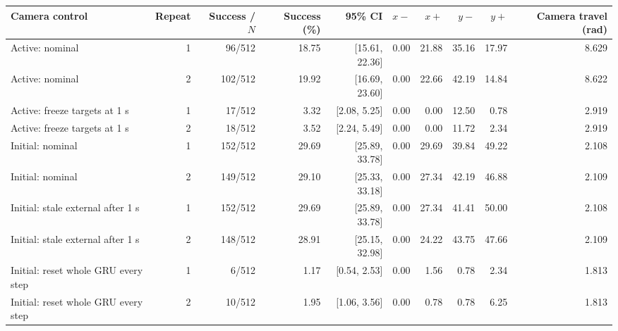 \begin{tabular}{lrrrrrrrrr}
\hline
Camera control & Repeat & Success / $N$ & Success (\%) & 95\% CI & $x-$ & $x+$ & $y-$ & $y+$ & Camera travel (rad) \\
\hline
Active: nominal & 1 & 96/512 & 18.75 & [15.61, 22.36] & 0.00 & 21.88 & 35.16 & 17.97 & 8.629 \\
Active: nominal & 2 & 102/512 & 19.92 & [16.69, 23.60] & 0.00 & 22.66 & 42.19 & 14.84 & 8.622 \\
Active: freeze targets at 1 s & 1 & 17/512 & 3.32 & [2.08, 5.25] & 0.00 & 0.00 & 12.50 & 0.78 & 2.919 \\
Active: freeze targets at 1 s & 2 & 18/512 & 3.52 & [2.24, 5.49] & 0.00 & 0.00 & 11.72 & 2.34 & 2.919 \\
Initial: nominal & 1 & 152/512 & 29.69 & [25.89, 33.78] & 0.00 & 29.69 & 39.84 & 49.22 & 2.108 \\
Initial: nominal & 2 & 149/512 & 29.10 & [25.33, 33.18] & 0.00 & 27.34 & 42.19 & 46.88 & 2.109 \\
Initial: stale external after 1 s & 1 & 152/512 & 29.69 & [25.89, 33.78] & 0.00 & 27.34 & 41.41 & 50.00 & 2.108 \\
Initial: stale external after 1 s & 2 & 148/512 & 28.91 & [25.15, 32.98] & 0.00 & 24.22 & 43.75 & 47.66 & 2.109 \\
Initial: reset whole GRU every step & 1 & 6/512 & 1.17 & [0.54, 2.53] & 0.00 & 1.56 & 0.78 & 2.34 & 1.813 \\
Initial: reset whole GRU every step & 2 & 10/512 & 1.95 & [1.06, 3.56] & 0.00 & 0.78 & 0.78 & 6.25 & 1.813 \\
\hline
\end{tabular}

